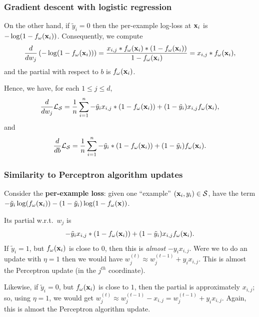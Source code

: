 \documentclass{beamer}
\theoremstyle{example}
\begin{document}
\begin{frame}
    \frametitle{Gradient descent with logistic regression}
    On the other hand, if $\tilde y_i = 0$ then the per-example log-loss at ${\bf x}_i$ is $-\log(1-f_{\omega}({\bf x}_i))$. \pause Consequently, we compute 
        \[\frac{d}{dw_j}\left( -\log(1-f_{\omega}({\bf x}_i)) \right) = \frac{x_{i,j}\ast f_{\omega}({\bf x}_i)\ast(1 - f_{\omega}({\bf x}_i))}{1-f_{\omega}({\bf x}_i)} = x_{i,j}\ast f_{\omega}({\bf x}_i),\]
and the partial with respect to $b$ is $f_{\omega}({\bf x}_i)$.

\pause
Hence, we have, for each $1\le j\le d$,
    \[\frac{d}{dw_j}\mathcal L_{\mathcal S} = \frac1n\sum_{i=1}^n -\tilde y_ix_{i,j}\ast(1-f_{\omega}({\bf x}_i)) + (1-\tilde y_i)x_{i,j}f_{\omega}({\bf x}_i),\]
and 
    \[\frac{d}{db}\mathcal L_{\mathcal S} = \frac1n\sum_{i=1}^n -\tilde y_i\ast(1-f_{\omega}({\bf x}_i)) + (1-\tilde y_i)f_{\omega}({\bf x}_i).\]
\end{frame}

\begin{frame}
    \frametitle{Similarity to Perceptron algorithm updates}
    Consider the \textbf{per-example loss}: given one ``example'' $({\bf x}_i, y_i) \in\mathcal S$, have the term $-\tilde y_i\log(f_{\omega}({\bf x}_i)) - (1 - \tilde y_i)\log(1 - f_{\omega}({\bf x}))$.

    Its partial w.r.t.\ $w_j$ is 
        \[-\tilde y_ix_{i,j}\ast(1-f_{\omega}({\bf x}_i)) + (1-\tilde y_i)x_{i,j}f_{\omega}({\bf x}_i).\]
    If $\tilde y_i=1$, but $f_{\omega}({\bf x}_i)$ is close to 0, then this is \textit{almost} $-y_i x_{i,j}$. Were we to do an update with $\eta=1$ then we would have $w_j^{(t)} \approx w_j^{(t-1)} + y_i x_{i,j}$. This is almost the Perceptron update (in the $j^{th}$ coordinate).

    Likewise, if $\tilde y_i=0$, but $f_{\omega}({\bf x}_i)$ is close to $1$, then the partial is approximately $x_{i,j}$; so, using $\eta=1$, we would get $w_j^{(t)} \approx w_j^{(t-1)} - x_{i,j} = w_j^{(t-1)} + y_ix_{i,j}$. Again, this is almost the Perceptron algorithm update.
\end{frame}
\end{document}
